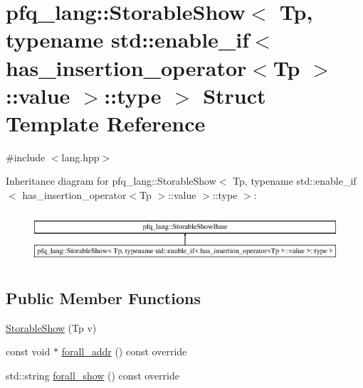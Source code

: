 \hypertarget{structpfq__lang_1_1StorableShow_3_01Tp_00_01typename_01std_1_1enable__if_3_01has__insertion__ope410294f2cbdf117d0cfbbeb13476ebf1}{\section{pfq\+\_\+lang\+:\+:Storable\+Show$<$ Tp, typename std\+:\+:enable\+\_\+if$<$ has\+\_\+insertion\+\_\+operator$<$Tp $>$\+:\+:value $>$\+:\+:type $>$ Struct Template Reference}
\label{structpfq__lang_1_1StorableShow_3_01Tp_00_01typename_01std_1_1enable__if_3_01has__insertion__ope410294f2cbdf117d0cfbbeb13476ebf1}
}


{\ttfamily \#include $<$lang.\+hpp$>$}

Inheritance diagram for pfq\+\_\+lang\+:\+:Storable\+Show$<$ Tp, typename std\+:\+:enable\+\_\+if$<$ has\+\_\+insertion\+\_\+operator$<$Tp $>$\+:\+:value $>$\+:\+:type $>$\+:\begin{figure}[H]
\begin{center}
\leavevmode
\includegraphics[height=1.911263cm]{structpfq__lang_1_1StorableShow_3_01Tp_00_01typename_01std_1_1enable__if_3_01has__insertion__ope410294f2cbdf117d0cfbbeb13476ebf1}
\end{center}
\end{figure}
\subsection*{Public Member Functions}
\begin{DoxyCompactItemize}
\item 
\hyperlink{structpfq__lang_1_1StorableShow_3_01Tp_00_01typename_01std_1_1enable__if_3_01has__insertion__ope410294f2cbdf117d0cfbbeb13476ebf1_a3d453254c884983343eb2c4e65a78345}{Storable\+Show} (Tp v)
\item 
const void $\ast$ \hyperlink{structpfq__lang_1_1StorableShow_3_01Tp_00_01typename_01std_1_1enable__if_3_01has__insertion__ope410294f2cbdf117d0cfbbeb13476ebf1_a5ec739ac33a3f48073bae2d30bb05630}{forall\+\_\+addr} () const override
\item 
std\+::string \hyperlink{structpfq__lang_1_1StorableShow_3_01Tp_00_01typename_01std_1_1enable__if_3_01has__insertion__ope410294f2cbdf117d0cfbbeb13476ebf1_a3125673ba8d8ca64063815f62b039da5}{forall\+\_\+show} () const override
\end{DoxyCompactItemize}

